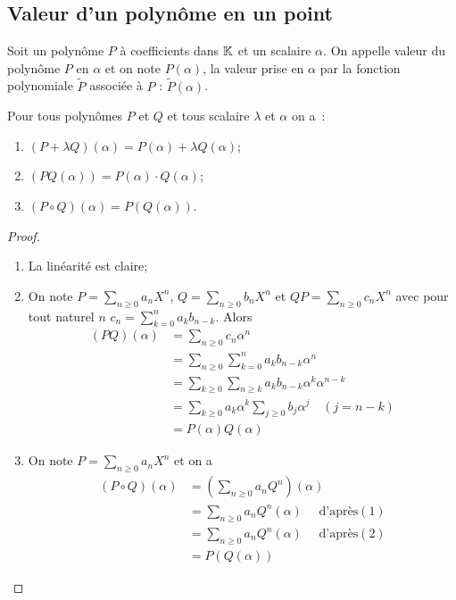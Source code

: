 \subsection{Valeur d'un polynôme en un point}

\begin{defdef}
  Soit un polynôme \(P\) à coefficients dans \(\mathbb{K}\) et un scalaire \(\alpha\). On appelle valeur du polynôme \(P\) en \(\alpha\) et on note \(P(\alpha)\), la valeur prise en \(\alpha\) par la fonction polynomiale \(\widetilde{P}\) associée à \(P\) : \(\widetilde{P}(\alpha)\).
\end{defdef}

\begin{prop}
  Pour tous polynômes \(P\) et \(Q\) et tous scalaire \(\lambda\) et \(\alpha\) on a~:
  \begin{enumerate}
  \item \((P+\lambda Q)(\alpha)=P(\alpha) + \lambda Q(\alpha)\);
  \item \((PQ(\alpha))=P(\alpha) \cdot Q(\alpha)\);
  \item \((P \circ Q)(\alpha) = P(Q(\alpha))\).
  \end{enumerate}
\end{prop}
\begin{proof}
  \begin{enumerate}
  \item La linéarité est claire;
  \item On note \(P=\sum_{n \geqslant 0}a_n X^n\), \(Q=\sum_{n \geqslant 0}b_n X^n\) et \(QP=\sum_{n \geqslant 0}c_n X^n\) avec pour tout naturel \(n\) \(c_n = \sum_{k=0}^n a_kb_{n-k}\). Alors
    \begin{align}
      (PQ)(\alpha)&=\sum_{n \geqslant 0}c_n \alpha^n \\
      &=\sum_{n \geqslant 0} \sum_{k=0}^n a_k b_{n-k} \alpha^n\\
      &=\sum_{k \geqslant 0} \sum_{n \geqslant k} a_k b_{n-k} \alpha^k \alpha^{n-k}\\
      &=\sum_{k \geqslant 0}  a_k  \alpha^k \sum_{j \geqslant 0} b_j \alpha^j \quad (j=n-k)\\
      &=P(\alpha) Q(\alpha)
    \end{align}
  \item On note \(P=\sum_{n \geqslant 0}a_n X^n\) et on a
    \begin{align}
      (P \circ Q)(\alpha) &= \left(\sum_{n \geqslant 0} a_n Q^n \right)(\alpha)\\
      &= \sum_{n \geqslant 0} a_n Q^n(\alpha) \quad \text{~d'après} (1)\\
      &= \sum_{n \geqslant 0} a_n Q^n(\alpha) \quad \text{~d'après} (2)\\
      &= P(Q(\alpha))
    \end{align}
  \end{enumerate}
\end{proof}


